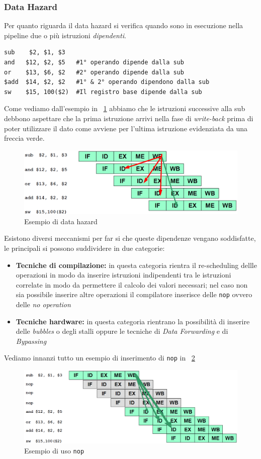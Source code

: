 \subsubsection{Data Hazard}
Per quanto riguarda il data hazard si verifica quando sono in esecuzione nella pipeline due o più istruzioni \emph{dipendenti}.
\begin{verbatim}
sub    $2, $1, $3
and   $12, $2, $5   #1° operando dipende dalla sub
or    $13, $6, $2   #2° operando dipende dalla sub
$add  $14, $2, $2   #1° & 2° operando dipendono dalla sub
sw    $15, 100($2)  #Il registro base dipende dalla sub
\end{verbatim}
Come vediamo dall'esempio in \figurename~\ref{fig:datahazard} abbiamo che le istruzioni successive alla sub debbono aspettare che la prima istruzione arrivi nella fase di \emph{write-back} prima di poter utilizzare il dato come avviene per l'ultima istruzione evidenziata da una freccia verde.
\begin{figure}[tb]
\centering
\includegraphics[scale=0.5]{img/datahazard.png}
\caption{Esempio di data hazard}\label{fig:datahazard}
\end{figure}
Esistono diversi meccanismi per far si che queste dipendenze vengano soddisfatte, le principali si possono suddividere in due categorie:
\begin{itemize}
\item \textbf{Tecniche di compilazione:} in questa categoria rientra il  re-scheduling dellle operazioni in modo da inserire istruzioni indipendenti tra le istruzioni correlate in modo da permettere il calcolo dei valori necessari; nel caso non sia possibile inserire altre operazioni il compilatore inserisce delle \texttt{nop} ovvero delle \emph{no operation}
\item \textbf{Tecniche hardware:} in questa categoria rientrano la possibilità di inserire delle \emph{bubbles} o degli stalli oppure le tecniche di \emph{Data Forwarding} e di \emph{Bypassing}
\end{itemize}
Vediamo innanzi tutto un esempio di inserimento di \texttt{nop} in \figurename~\ref{fig:nop}
\begin{figure}[tb]
\centering
\includegraphics[scale=0.45]{img/nop.png}
\caption{Esempio di uso \texttt{nop}}\label{fig:nop}
\end{figure}
